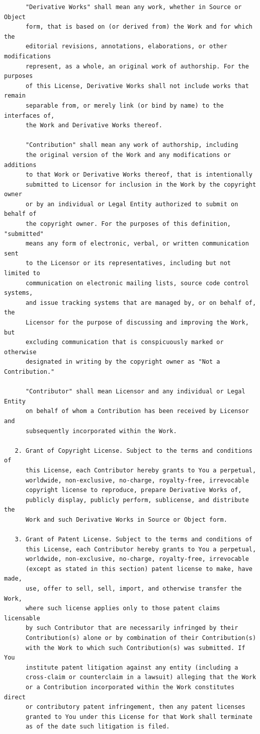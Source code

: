 \documentclass{book}
\begin{document}
\begin{verbatim}
      "Derivative Works" shall mean any work, whether in Source or Object
      form, that is based on (or derived from) the Work and for which the
      editorial revisions, annotations, elaborations, or other modifications
      represent, as a whole, an original work of authorship. For the purposes
      of this License, Derivative Works shall not include works that remain
      separable from, or merely link (or bind by name) to the interfaces of,
      the Work and Derivative Works thereof.

      "Contribution" shall mean any work of authorship, including
      the original version of the Work and any modifications or additions
      to that Work or Derivative Works thereof, that is intentionally
      submitted to Licensor for inclusion in the Work by the copyright owner
      or by an individual or Legal Entity authorized to submit on behalf of
      the copyright owner. For the purposes of this definition, "submitted"
      means any form of electronic, verbal, or written communication sent
      to the Licensor or its representatives, including but not limited to
      communication on electronic mailing lists, source code control systems,
      and issue tracking systems that are managed by, or on behalf of, the
      Licensor for the purpose of discussing and improving the Work, but
      excluding communication that is conspicuously marked or otherwise
      designated in writing by the copyright owner as "Not a Contribution."

      "Contributor" shall mean Licensor and any individual or Legal Entity
      on behalf of whom a Contribution has been received by Licensor and
      subsequently incorporated within the Work.

   2. Grant of Copyright License. Subject to the terms and conditions of
      this License, each Contributor hereby grants to You a perpetual,
      worldwide, non-exclusive, no-charge, royalty-free, irrevocable
      copyright license to reproduce, prepare Derivative Works of,
      publicly display, publicly perform, sublicense, and distribute the
      Work and such Derivative Works in Source or Object form.

   3. Grant of Patent License. Subject to the terms and conditions of
      this License, each Contributor hereby grants to You a perpetual,
      worldwide, non-exclusive, no-charge, royalty-free, irrevocable
      (except as stated in this section) patent license to make, have made,
      use, offer to sell, sell, import, and otherwise transfer the Work,
      where such license applies only to those patent claims licensable
      by such Contributor that are necessarily infringed by their
      Contribution(s) alone or by combination of their Contribution(s)
      with the Work to which such Contribution(s) was submitted. If You
      institute patent litigation against any entity (including a
      cross-claim or counterclaim in a lawsuit) alleging that the Work
      or a Contribution incorporated within the Work constitutes direct
      or contributory patent infringement, then any patent licenses
      granted to You under this License for that Work shall terminate
      as of the date such litigation is filed.


\end{verbatim}
\end{document}
